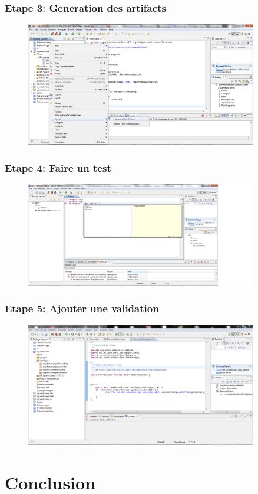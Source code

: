 \documentclass{beamer}
\begin{document}
	\begin{frame}
	\frametitle{Etape 3: Generation des artifacts}
	\begin{figure}[h]
	\centering
			\includegraphics[width=0.90\textwidth]{3.PNG}
	\label{fig:3}
\end{figure}

\end{frame} 
	\begin{frame}
	\frametitle{Etape 4: Faire un test}
	\begin{figure}[h]
	\centering
			\includegraphics[width=0.90\textwidth]{4.PNG}
	\label{fig:4}
\end{figure}

\end{frame} 	\begin{frame}
	\frametitle{Etape 5: Ajouter une validation}
	\begin{figure}[h]
	\centering
			\includegraphics[width=0.90\textwidth]{5.PNG}
	\label{fig:5}
\end{figure}

\end{frame} 


\section{Conclusion}
\end{document}
